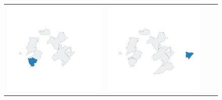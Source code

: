 \begin{figure}[p]
\begin{tabularx}{1\textwidth}{XXXX}
\includegraphics[width=1\linewidth]{images/ch6/loading/05}&
\includegraphics[width=1\linewidth]{images/ch6/loading/06}&

\end{tabularx}
\end{figure}

